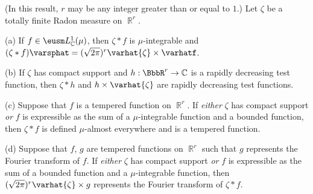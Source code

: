  (In this result, $r$ may be any integer greater
than or equal to $1$.)   Let $\zeta$ be a totally finite Radon measure on
$\BbbR^r$.

(a) If $f\in\eusm L^1_{\Bbb C}(\mu)$, then $\zeta*f$ is
$\mu$-integrable and
$(\zeta*f)\varsphat=(\sqrt{2\pi})^r\varhat{\zeta}\times\varhatf$.

(b) If $\zeta$ has compact support and
$h:\BbbR^r\to\Bbb C$ is a rapidly decreasing test
function,
then $\zeta*h$ and $h\times\varhat{\zeta}$ are rapidly decreasing test
functions.

(c) Suppose that $f$ is a tempered function on $\BbbR^r$.
If {\it either} $\zeta$ has compact support {\it or} $f$ is expressible as
the sum of a $\mu$-integrable function and a bounded function, then
$\zeta*f$ is defined $\mu$-almost everywhere and is a tempered function.

(d) Suppose that $f$, $g$ are tempered functions on
$\BbbR^r$ such that $g$ represents the Fourier transform
of $f$.   If {\it either} $\zeta$ has compact support
{\it or} $f$ is expressible as the sum of a bounded function and a
$\mu$-integrable function, then
$(\sqrt{2\pi})^r\varhat{\zeta}\times g$ represents the Fourier transform of
$\zeta*f$.

